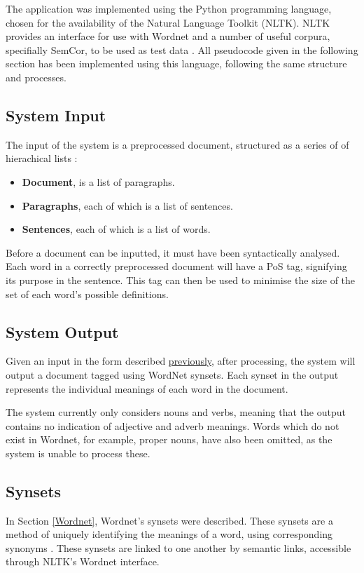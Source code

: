 \documentclass[]{article}
\begin{document}
The application was implemented using the Python programming language, chosen for the availability of the Natural Language Toolkit (NLTK). NLTK provides an interface for use with Wordnet and a number of useful corpura, specifially SemCor, to be used as test data \cite{NLTK}. All pseudocode given in the following section has been implemented using this language, following the same structure and processes.

\subsection{System Input}
\label{sec:CorpusAnalysis}
The input of the system is a preprocessed document, structured as a series of of hierachical lists \cite{NLTK}:

\begin{itemize}
	\item \textbf{Document}, is a list of paragraphs.
	\item \textbf{Paragraphs}, each of which is a list of sentences.
	\item \textbf{Sentences}, each of which is a list of words.
\end{itemize}

Before a document can be inputted, it must have been syntactically analysed. Each word in a correctly preprocessed document will have a PoS tag, signifying its purpose in the sentence. This tag can then be used to minimise the size of the set of each word's possible definitions.

\subsection{System Output}
\label{sec:SysOutput}
Given an input in the form described \hyperref[sec:CorpusAnalysis]{previously}, after processing, the system will output a document tagged using WordNet synsets. Each synset in the output represents the individual meanings of each word in the document. 

The system currently only considers nouns and verbs, meaning that the output contains no indication of adjective and adverb meanings. Words which do not exist in Wordnet, for example, proper nouns, have also been omitted, as the system is unable to process these.

\subsection{Synsets}
\label{sec:ImplementedSynsets}
In Section \ref{Wordnet}, Wordnet's synsets were described. These synsets are a method of uniquely identifying the meanings of a word, using corresponding synonyms \cite{WN1Introduction}. These synsets are linked to one another by semantic links, accessible through NLTK's Wordnet interface. 
\end{document}
